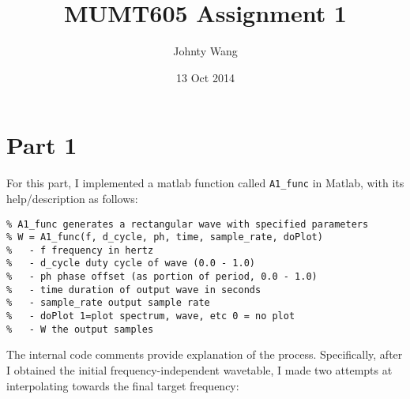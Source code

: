 \documentclass[12pt]{article}
\title{MUMT605 Assignment 1}
\author{Johnty Wang}
\date{13 Oct 2014}
\begin{document}
\maketitle
\section*{Part 1}
For this part, I implemented a matlab function called \verb|A1_func| in Matlab, with its help/description as follows:

\begin{verbatim}
% A1_func generates a rectangular wave with specified parameters
% W = A1_func(f, d_cycle, ph, time, sample_rate, doPlot)
%   - f frequency in hertz
%   - d_cycle duty cycle of wave (0.0 - 1.0)
%   - ph phase offset (as portion of period, 0.0 - 1.0)
%   - time duration of output wave in seconds
%   - sample_rate output sample rate
%   - doPlot 1=plot spectrum, wave, etc 0 = no plot
%   - W the output samples
\end{verbatim}

The internal code comments provide explanation of the process. Specifically, after I obtained the initial frequency-independent wavetable, I made two attempts at interpolating towards the final target frequency:
\end{document}
